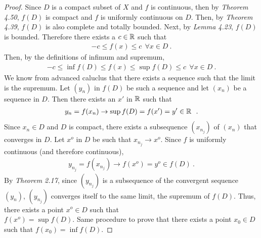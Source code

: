 \begin{questions}


\begin{solution}
  \begin{proof}
  Since $D$ is a compact subset of $X$ and $f$ is continuous, then by \textit{Theorem 4.50}, $f(D)$ is compact and $f$ is uniformly continuous on $D$. Then, by \textit{Theorem 4.39}, $f(D)$ is also complete and totally bounded. Next, by \textit{Lemma 4.23}, $f(D)$ is bounded. Therefore there exists a $c\in\mathbb{R}$ such that
  \begin{align*}
  -c\leq f(x)\leq c~~\forall x\in D~.
  \end{align*}
  Then, by the definitions of infimum and supremum,
  \begin{align*}
  -c\leq\inf f(D)\leq f(x)\leq\sup f(D)\leq c~~\forall x\in D~.  
  \end{align*}
  We know from advanced caluclus that there exists a sequence such that the limit is the supremum. Let $(y_n)$ in $f(D)$ be such a sequence and let $(x_n)$ be a sequence in $D$. Then there exists an $x'$ in $\mathbb{R}$ such that
  \begin{align*}
	y_n=f(x_n)\rightarrow\sup f(D)= f(x')=y'\in \mathbb{R}~~.
\end{align*}
Since $x_n\in D$ and $D$ is compact, there exists a subsequence $(x_{n_j})$ of $(x_n)$ that converges in $D$. Let $x^o$ in $D$ be such that $x_{n_j}\rightarrow x^o$. Since $f$ is uniformly continuous (and therefore continuous),
\begin{align*}
y_{n_j}=f(x_{n_j})\rightarrow f(x^o)=y^o\in f(D)~.
\end{align*}
By \textit{Theorem 2.17}, since $(y_{n_j})$ is a subsequence of the convergent sequence $(y_n)$, $(y_{n_j})$ converges itself to the same limit, the supremum of $f(D)$. Thus, there exists a point $x^o\in D$ such that\\ $f(x^o)=\sup f(D)$. Same procedure to prove that there exists a point $x_0\in D$ such that $f(x_0)=\inf f(D)$.

\end{proof}
\end{solution}
\end{questions}